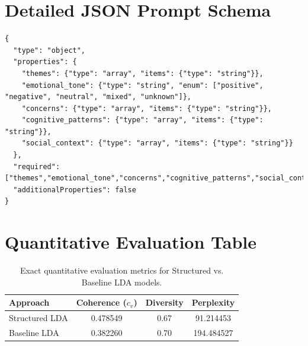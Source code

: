\documentclass{article}
\begin{document}




\appendix
\section{Detailed JSON Prompt Schema}
\label{app:prompt-schema}
\begin{verbatim}
{
  "type": "object",
  "properties": {
    "themes": {"type": "array", "items": {"type": "string"}},
    "emotional_tone": {"type": "string", "enum": ["positive", "negative", "neutral", "mixed", "unknown"]},
    "concerns": {"type": "array", "items": {"type": "string"}},
    "cognitive_patterns": {"type": "array", "items": {"type": "string"}},
    "social_context": {"type": "array", "items": {"type": "string"}}
  },
  "required": ["themes","emotional_tone","concerns","cognitive_patterns","social_context"],
  "additionalProperties": false
}
\end{verbatim}

\section{Quantitative Evaluation Table}
\label{app:metrics}
\begin{table}[ht]
    \centering
    \begin{tabular}{lccc}
        \hline
        Approach       & Coherence ($c_v$) & Diversity & Perplexity \\
        \hline
        Structured LDA & 0.478549          & 0.67      & 91.214453  \\
        Baseline LDA   & 0.382260          & 0.70      & 194.484527 \\
        \hline
    \end{tabular}
    \caption{Exact quantitative evaluation metrics for Structured vs. Baseline LDA models.}
    \label{tab:metrics-app}
\end{table}
\end{document}
